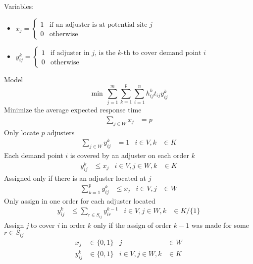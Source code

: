 Variables:
\begin{itemize}
\item $x_j =
  \begin{cases} 
    1 & \mbox{if an adjuster is at potential site } j \\
    0 & \mbox{otherwise}
  \end{cases}$
\item $y_{ij}^{k} =
  \begin{cases} 
    1 & \mbox{if adjuster in } j \mbox{, is the }
    k\mbox{-th to cover demand point } i \\
    0 & \mbox{otherwise}
  \end{cases}$
\end{itemize}

Model
{\small
  \begin{equation}
    \min \, \sum_{j=1}^{m}{
      \sum_{k=1}^{p}{
        \sum_{i=1}^{n}{
          h_{ij}^{k}t_{ij}y_{ij}^{k}
        }
      }
    }
  \end{equation}
}
Minimize the average expected response time
\begin{align}
  \label{eq:2}
  \sum_{j \in W}{x_j}
  & = p
\end{align}
Only locate $p$ adjusters
\begin{align}
  \label{eq:3}
  \sum_{j \in W}{y_{ij}^{k}}
  & = 1
  & i \in V, k
  &\in K
\end{align}
Each demand point $i$ is covered by an adjuster on each order $k$
\begin{align}
  \label{eq:4}
  y_{ij}^{k}
  & \leq x_j
  & i \in V,j \in W, k
  &\in K
\end{align}
Assigned only if there is an adjuster located at $j$
\begin{align}
  \label{eq:5}
  \sum_{k = 1}^{p}{
    y_{ij}^{k}
  }
  & \leq x_j
  & i \in V, j 
  & \in W
\end{align}
Only assign in one order for each adjuster located 
\begin{align}
  y_{ij}^{k} 
  & \leq \sum_{r\in S_{ij}}{y_{ir}^{k-1}}
  & i \in V,j \in W, k
  & \in K/\{1\}
\end{align}
Assign \textit{j} to cover \textit{i} in order $k$
only if
the assign of order $k-1$
was made for some $r \in S_{ij}$
\begin{align}
  x_{j}
  & \in \{0,1\}
  & j 
  & \in W \nonumber
  \\
  y_{ij}^{k}
  & \in \{0,1\}
  &  i \in V,j \in W,k
  &\in K \nonumber
\end{align}

